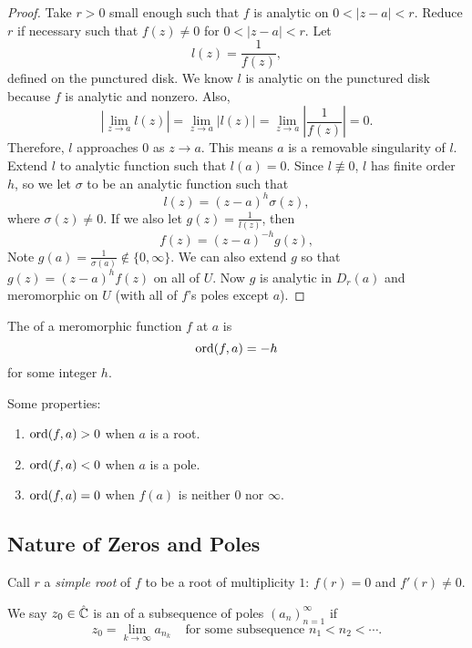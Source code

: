 \begin{proof}
    Take $r > 0$ small enough such that $f$ is analytic
    on $0 < |z-a| < r$.
    Reduce $r$ if necessary such that $f(z) \ne 0$ for
    $0 < |z-a| < r$.
    Let 
    \[ l(z) = \frac{1}{f(z)}, \]
    defined on the punctured disk.  
    We know $l$ is analytic on the punctured disk because
    $f$ is analytic and nonzero.
    Also,
    \[ \left| \lim_{z \to a} l(z) \right|
        = \lim_{z \to a} |l(z)|
        = \lim_{z \to a} \left| \frac{1}{f(z)}\right|
        = 0.
    \]
    Therefore, $l$ approaches $0$ as $z \to a$.
    This means $a$ is a removable singularity of $l$.
    Extend $l$ to analytic function such that $l(a) = 0$.
    Since $l \nequiv 0$, $l$ has finite order $h$, so we
    let $\sigma$ to be an analytic function such that
    \[ l(z) = (z-a)^h \sigma(z), \]
    where $\sigma(z) \ne 0$.
    If we also let $g(z) = \frac{1}{l(z)}$, then
    \[ f(z) = (z-a)^{-h} g(z), \]
    Note $g(a) = \frac{1}{\sigma(a)} \notin \{0, \infty \}$.
    We can also extend $g$ so that $g(z) = (z-a)^hf(z)$ 
    on all of $U$.
    Now $g$ is analytic in $D_r(a)$ and meromorphic on $U$
    (with all of $f$'s poles except $a$).
\end{proof}

\begin{definition}
    The  of a meromorphic function $f$ at 
    $a$ is 
    \[ \operatorname{ord}(f, a) = -h \]
    for some integer $h$.
\end{definition}

Some properties:
\begin{enumerate}
    \item $\operatorname{ord}(f, a) > 0$ when $a$ is a root.
    \item $\operatorname{ord}(f, a) < 0$ when $a$ is a pole.
    \item $\operatorname{ord}(f, a) = 0$ when $f(a)$ is neither $0$ nor
        $\infty$.
\end{enumerate}



\subsection{Nature of Zeros and Poles}

Call $r$ a \emph{simple root} of $f$ to be a root of 
multiplicity $1$: $f(r) = 0$ and $f'(r) \ne 0$.

\begin{definition}
    We say $z_0 \in \hat{\operatorname{\mathbb{C}}}$ is an 
    of a subsequence of poles $(a_n)_{n=1}^{\infty}$ if
    \[ z_0 = \lim_{k \to \infty} a_{n_k} \;\;\;\; \text{for 
    some subsequence $n_1 < n_2 < \cdots$}. \]
\end{definition}

